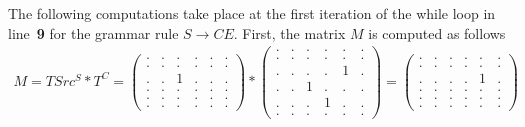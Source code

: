 The following computations take place at the first iteration of the while loop in line~\textbf{9} for the grammar rule $S \to C E$.
First, the matrix $M$ is computed as follows
{
    \renewcommand{\arraystretch}{0.7}
    \setlength\arraycolsep{2pt}
\begin{align*}
M=TSrc^S*T^C =
\begin{pmatrix}
    . & . & . & . & . & . \\
    . & . & . & . & . & . \\
    . & . & 1 & . & . & . \\
    . & . & . & . & . & . \\
    . & . & . & . & . & . \\
    . & . & . & . & . & .
\end{pmatrix}*
\begin{pmatrix}
    . & . & . & . & . & . \\
    . & . & . & . & . & . \\
    . & . & . & . & 1 & . \\
    . & . & 1 & . & . & . \\
    . & . & . & 1 & . & . \\
    . & . & . & . & . & .
\end{pmatrix}=
\begin{pmatrix}
    . & . & . & . & . & . \\
    . & . & . & . & . & . \\
    . & . & . & . & 1 & . \\
    . & . & . & . & . & . \\
    . & . & . & . & . & . \\
    . & . & . & . & . & .
\end{pmatrix}
\end{align*}
}

